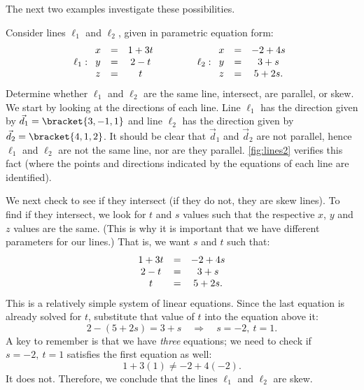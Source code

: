The next two examples investigate these possibilities.

\begin{example}\label{ex_lines2}
Consider lines $\ell_1$ and $\ell_2$, given in parametric equation form:
\[
\ell_1: \begin{array}{ c c c } x&=&1+3t \\ y&=&2-t\\z&=&t\end{array}
\qquad\qquad
\ell_2: \begin{array}{ c c c } x&=&-2+4s\\y&=&3+s\\z&=&5+2s.\end{array}
\]
Determine whether $\ell_1$ and $\ell_2$ are the same line, intersect, are parallel, or skew.
\solution
We start by looking at the directions of each line. Line $\ell_1$ has the direction given by $\vec d_1=\bracket{3,-1,1}$ and line $\ell_2$ has the direction given by $\vec d_2 =\bracket{4,1,2}$. It should be clear that $\vec d_1$ and $\vec d_2$ are not parallel, hence $\ell_1$ and $\ell_2$ are not the same line, nor are they parallel. \autoref{fig:lines2} verifies this fact (where the points and directions indicated by the equations of each line are identified).


We next check to see if they intersect (if they do not, they are skew lines). To find if they intersect, we look for $t$ and $s$ values such that the respective $x$, $y$ and $z$ values are the same. (This is why it is important that we have different parameters for our lines.) That is, we want $s$ and $t$ such that:
\[
\begin{array}{ c c c }
1+3t &=&-2+4s\\
2-t&=&3+s\\
t&=&5+2s.\end{array}
\]
This is a relatively simple system of linear equations. Since the last equation is already solved for $t$, substitute that value of $t$ into the equation above it:
\[2-(5+2s) = 3+s \quad \Rightarrow \quad s=-2,\ t=1.\]
A key to remember is that we have \emph{three} equations; we need to check if $s=-2,\ t=1$ satisfies the first equation as well:
\[1+3(1) \neq -2+4(-2).\]
It does not. Therefore, we conclude that the lines $\ell_1$ and $\ell_2$ are skew.
\end{example}

